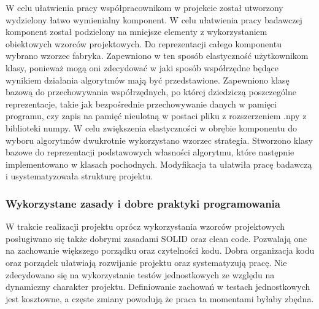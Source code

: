 \documentclass{article}
\begin{document}
W celu ułatwienia pracy współpracownikom w projekcie został utworzony wydzielony łatwo wymienialny komponent. W celu ułatwienia pracy badawczej komponent został podzielony na mniejsze elementy z wykorzystaniem obiektowych wzorców projektowych.
Do reprezentacji całego komponentu wybrano wzorzec fabryka. Zapewniono w ten sposób elastyczność użytkownikom klasy, ponieważ mogą oni zdecydować w jaki sposób współrzędne będące wynikiem działania algorytmów mają być przedstawione. Zapewniono klasę bazową do przechowywania współrzędnych, po której dziedziczą poszczególne reprezentacje, takie jak bezpośrednie przechowywanie danych w pamięci programu, czy zapis na pamięć nieulotną w postaci pliku z rozszerzeniem .npy z biblioteki numpy.
W celu zwiększenia elastyczności w obrębie komponentu do wyboru algorytmów dwukrotnie wykorzystano wzorzec strategia. Stworzono klasy bazowe do reprezentacji podstawowych własności algorytmu, które następnie implementowano w klasach pochodnych. Modyfikacja ta ułatwiła pracę badawczą i usystematyzowała strukturę projektu.
\subsubsection{Wykorzystane zasady i dobre praktyki programowania}

W trakcie realizacji projektu oprócz wykorzystania wzorców projektowych posługiwano się także dobrymi zasadami SOLID oraz clean code. Pozwalają one na zachowanie większego porządku oraz czytelności kodu. Dobra organizacja kodu oraz porządek ułatwiają rozwijanie projektu oraz systematyzują pracę. Nie zdecydowano się na wykorzystanie testów jednostkowych ze względu na dynamiczny charakter projektu. Definiowanie zachowań w testach jednostkowych jest kosztowne, a częste zmiany powodują że praca ta momentami byłaby zbędna.
\end{document}
